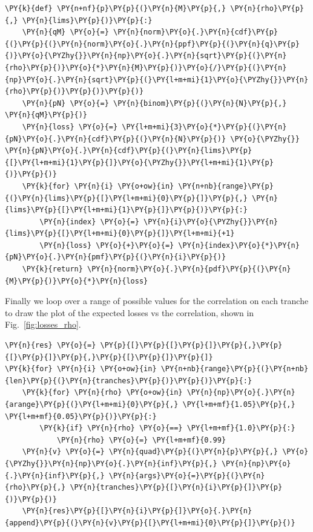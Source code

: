 \begin{tcolorbox}[breakable, size=fbox, boxrule=1pt, pad at break*=1mm,colback=cellbackground, colframe=cellborder]
\begin{Verbatim}[commandchars=\\\{\}]
\PY{k}{def} \PY{n+nf}{p}\PY{p}{(}\PY{n}{M}\PY{p}{,} \PY{n}{rho}\PY{p}{,} \PY{n}{lims}\PY{p}{)}\PY{p}{:}
    \PY{n}{qM} \PY{o}{=} \PY{n}{norm}\PY{o}{.}\PY{n}{cdf}\PY{p}{(}\PY{p}{(}\PY{n}{norm}\PY{o}{.}\PY{n}{ppf}\PY{p}{(}\PY{n}{q}\PY{p}{)}\PY{o}{\PYZhy{}}\PY{n}{np}\PY{o}{.}\PY{n}{sqrt}\PY{p}{(}\PY{n}{rho}\PY{p}{)}\PY{o}{*}\PY{n}{M}\PY{p}{)}\PY{o}{/}\PY{p}{(}\PY{n}{np}\PY{o}{.}\PY{n}{sqrt}\PY{p}{(}\PY{l+m+mi}{1}\PY{o}{\PYZhy{}}\PY{n}{rho}\PY{p}{)}\PY{p}{)}\PY{p}{)}
    \PY{n}{pN} \PY{o}{=} \PY{n}{binom}\PY{p}{(}\PY{n}{N}\PY{p}{,} \PY{n}{qM}\PY{p}{)}
    \PY{n}{loss} \PY{o}{=} \PY{l+m+mi}{3}\PY{o}{*}\PY{p}{(}\PY{n}{pN}\PY{o}{.}\PY{n}{cdf}\PY{p}{(}\PY{n}{N}\PY{p}{)} \PY{o}{\PYZhy{}} \PY{n}{pN}\PY{o}{.}\PY{n}{cdf}\PY{p}{(}\PY{n}{lims}\PY{p}{[}\PY{l+m+mi}{1}\PY{p}{]}\PY{o}{\PYZhy{}}\PY{l+m+mi}{1}\PY{p}{)}\PY{p}{)}
    \PY{k}{for} \PY{n}{i} \PY{o+ow}{in} \PY{n+nb}{range}\PY{p}{(}\PY{n}{lims}\PY{p}{[}\PY{l+m+mi}{0}\PY{p}{]}\PY{p}{,} \PY{n}{lims}\PY{p}{[}\PY{l+m+mi}{1}\PY{p}{]}\PY{p}{)}\PY{p}{:}
        \PY{n}{index} \PY{o}{=} \PY{n}{i}\PY{o}{\PYZhy{}}\PY{n}{lims}\PY{p}{[}\PY{l+m+mi}{0}\PY{p}{]}\PY{l+m+mi}{+1}
        \PY{n}{loss} \PY{o}{+}\PY{o}{=} \PY{n}{index}\PY{o}{*}\PY{n}{pN}\PY{o}{.}\PY{n}{pmf}\PY{p}{(}\PY{n}{i}\PY{p}{)}  
    \PY{k}{return} \PY{n}{norm}\PY{o}{.}\PY{n}{pdf}\PY{p}{(}\PY{n}{M}\PY{p}{)}\PY{o}{*}\PY{n}{loss}
\end{Verbatim}
\end{tcolorbox}

Finally we loop over a range of possible values for the correlation on each tranche to draw the plot of the expected losses vs the correlation, shown in Fig.~\ref{fig:losses_rho}.

\begin{tcolorbox}[breakable, size=fbox, boxrule=1pt, pad at break*=1mm,colback=cellbackground, colframe=cellborder]
\begin{Verbatim}[commandchars=\\\{\}]
\PY{n}{res} \PY{o}{=} \PY{p}{[}\PY{p}{[}\PY{p}{]}\PY{p}{,}\PY{p}{[}\PY{p}{]}\PY{p}{,}\PY{p}{[}\PY{p}{]}\PY{p}{]}
\PY{k}{for} \PY{n}{i} \PY{o+ow}{in} \PY{n+nb}{range}\PY{p}{(}\PY{n+nb}{len}\PY{p}{(}\PY{n}{tranches}\PY{p}{)}\PY{p}{)}\PY{p}{:}
    \PY{k}{for} \PY{n}{rho} \PY{o+ow}{in} \PY{n}{np}\PY{o}{.}\PY{n}{arange}\PY{p}{(}\PY{l+m+mi}{0}\PY{p}{,} \PY{l+m+mf}{1.05}\PY{p}{,} \PY{l+m+mf}{0.05}\PY{p}{)}\PY{p}{:}
        \PY{k}{if} \PY{n}{rho} \PY{o}{==} \PY{l+m+mf}{1.0}\PY{p}{:}
            \PY{n}{rho} \PY{o}{=} \PY{l+m+mf}{0.99}
    \PY{n}{v} \PY{o}{=} \PY{n}{quad}\PY{p}{(}\PY{n}{p}\PY{p}{,} \PY{o}{\PYZhy{}}\PY{n}{np}\PY{o}{.}\PY{n}{inf}\PY{p}{,} \PY{n}{np}\PY{o}{.}\PY{n}{inf}\PY{p}{,} \PY{n}{args}\PY{o}{=}\PY{p}{(}\PY{n}{rho}\PY{p}{,} \PY{n}{tranches}\PY{p}{[}\PY{n}{i}\PY{p}{]}\PY{p}{)}\PY{p}{)}
    \PY{n}{res}\PY{p}{[}\PY{n}{i}\PY{p}{]}\PY{o}{.}\PY{n}{append}\PY{p}{(}\PY{n}{v}\PY{p}{[}\PY{l+m+mi}{0}\PY{p}{]}\PY{p}{)}
\end{Verbatim}
\end{tcolorbox}

